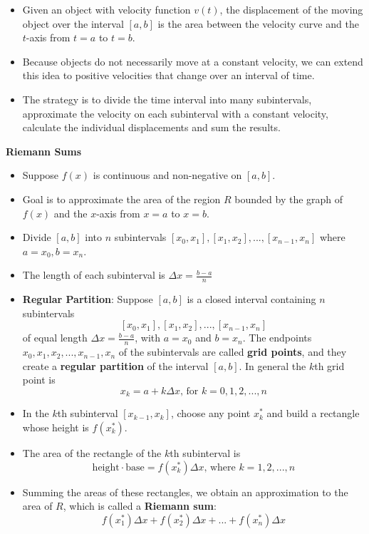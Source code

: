 \documentclass{article}
\begin{document}
\begin{itemize}
\begin{itemize}
        \item Given an object with velocity function $v(t)$, the displacement of the moving object over the interval $[a,b]$ is the area between the velocity curve and the $t$-axis from $t = a$ to $t = b$.
        \item Because objects do not necessarily move at a constant velocity, we can extend this idea to positive velocities that change over an interval of time.
        \item The strategy is to divide the time interval into many subintervals, approximate the velocity on each subinterval with a constant velocity, calculate the individual displacements and sum the results.
    \end{itemize}
    \textbf{Riemann Sums}
    \begin{itemize}
        \item Suppose $f(x)$ is continuous and non-negative on $[a,b]$.
        \item Goal is to approximate the area of the region $R$ bounded by the graph of $f(x)$ and the $x$-axis from $x = a$ to $x = b$.
        \item Divide $[a,b]$ into $n$ subintervals $[x_0,x_1],[x_1,x_2],...,[x_{n-1},x_n]$ where $a = x_0, b = x_n$.
        \item The length of each subinterval is $\Delta x = \frac{b - a}{n}$
        \item \textbf{Regular Partition}: Suppose $[a,b]$ is a closed interval containing $n$ subintervals
            $$[x_0,x_1],[x_1,x_2],...,[x_{n-1},x_n]$$
        of equal length $\Delta x = \frac{b - a}{n}$, with $a = x_0$ and $b = x_n$. The endpoints $x_0, x_1, x_2,...,x_{n - 1},x_n$ of the subintervals are called \textbf{grid points}, and they create a \textbf{regular partition} of the interval $[a,b]$. In general the $k$th grid point is
            $$x_k = a + k\Delta x\text{, for } k = 0,1,2,...,n$$
        \item In the $k$th subinterval $[x_{k - 1}, x_k]$, choose any point $x_k^*$ and build a rectangle whose height is $f(x_k^*)$.
        \item The area of the rectangle of the $k$th subinterval is
            $$\text{height} \cdot \text{base} = f(x_k^*)\Delta x\text{, where } k = 1,2,...,n$$
        \item Summing the areas of these rectangles, we obtain an approximation to the area of $R$, which is called a \textbf{Riemann sum}:
            $$f(x_1^*)\Delta x + f(x_2^*)\Delta x + ... + f(x_n^*)\Delta x$$

\end{itemize}
\end{itemize}
\end{document}
